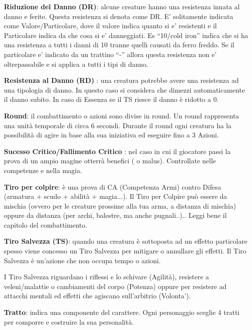 \documentclass[a4paper,11pt,twoside,openany]{book}
\begin{document}
\textbf{Riduzione del Danno (DR)}:   alcune creature hanno una resistenza innata al danno e ferite. Questa resistenza si denota come DR.
E’ solitamente indicata come Valore/Particolare, dove il valore indica quanto si e’ resistenti e il Particolare indica da che cosa si e’ danneggiati. Es “10/cold iron” indica che si ha una resistenza a tutti i danni di 10 tranne quelli causati da ferro freddo.
Se il particolare e’ indicato da un trattino “-” allora questa resistenza non e’ oltrepassabile e si applica a tutti i tipi di danno.

\textbf{Resistenza al Danno (RD)}  : una creatura potrebbe avere una resistenza ad una tipologia di danno. In questo caso si considera che dimezzi automaticamente il danno subito.
In caso di Essenza se il TS riesce il danno è ridotto a 0.

\textbf{Round}: il combattimento o azioni sono divise in round. Un round rappresenta una unità temporale di circa 6 secondi. Durante il round ogni creatura ha la possibilità di agire in base alla sua iniziativa ed eseguire fino a 3 Azioni.

\textbf{Sucesso Critico/Fallimento Critico} : nel caso in cui il giocatore passi la prova di un ampio magine otterrà benefici ( o malus). Controllate nelle competenze e nella magia.

\textbf{Tiro per colpire}: è una prova di CA (Competenza Armi) contro Difesa (armatura + scudo + abilità + magia...). Il Tiro per Colpire può essere da mischia (ovvero per le creature prossime alla tua arma, a distanza di mischia) oppure da distanza (per archi, balestre, ma anche pugnali..).. Leggi bene il capitolo del combattimento.

\textbf{Tiro Salvezza (TS)}: quando una creatura è sottoposta ad un effetto particolare spesso viene concesso un Tiro Salvezza per mitigare o annullare gli effetti. Il Tiro Salvezza è un'azione che non occupa tempo o azioni. 

I Tiro Salvezza riguardano i riflessi e lo schivare (Agilità), resistere a veleni/malattie o cambiamenti del corpo (Potenza) oppure per resistere ad attacchi mentali ed effetti che agiscano sull'arbitrio (Volonta').

\textbf{Tratto}: indica una componente del carattere. Ogni personaggio sceglie 4 tratti per comporre e costruire la sua personalità.
\end{document}
